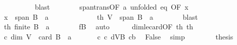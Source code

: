 \begin{isabellebody}
\ \ \ \ \ \ \ \ \isamarkupfalse%
\ blast\isanewline
\ \ \ \ \ \ \isamarkupfalse%
\ span{\isacharunderscore}{\kern0pt}trans{\isacharbrackleft}{\kern0pt}OF\ a{\isacharparenleft}{\kern0pt}{}{\isacharparenright}{\kern0pt}{\isacharcomma}{\kern0pt}\ unfolded\ eq{\isacharcomma}{\kern0pt}\ OF\ x{\isacharprime}{\kern0pt}{\isacharbrackright}{\kern0pt}\isanewline
\ \ \ \ \ \ \isamarkupfalse%
\ {\isachardoublequoteopen}x\ {\isasymin}\ span\ {\isacharparenleft}{\kern0pt}B\ {\isacharminus}{\kern0pt}\ {\isacharbraceleft}{\kern0pt}a{\isacharbraceright}{\kern0pt}{\isacharparenright}{\kern0pt}{\isachardoublequoteclose}\ \isacommand{{\isachardot}{\kern0pt}}\isamarkupfalse%
\isanewline
\ \ \ \ \isacommand{{\isacharbraceright}{\kern0pt}}\isamarkupfalse%
\isanewline
\ \ \ \ \isamarkupfalse%
\ \isamarkupfalse%
\ th{}{\isacharcolon}{\kern0pt}\ {\isachardoublequoteopen}V\ {\isasymsubseteq}\ span\ {\isacharparenleft}{\kern0pt}B\ {\isacharminus}{\kern0pt}\ {\isacharbraceleft}{\kern0pt}a{\isacharbraceright}{\kern0pt}{\isacharparenright}{\kern0pt}{\isachardoublequoteclose}\isanewline
\ \ \ \ \ \ \isamarkupfalse%
\ blast\isanewline
\ \ \ \ \isamarkupfalse%
\ th{}{\isacharcolon}{\kern0pt}\ {\isachardoublequoteopen}finite\ {\isacharparenleft}{\kern0pt}B\ {\isacharminus}{\kern0pt}\ {\isacharbraceleft}{\kern0pt}a{\isacharbraceright}{\kern0pt}{\isacharparenright}{\kern0pt}{\isachardoublequoteclose}\isanewline
\ \ \ \ \ \ \isamarkupfalse%
\ fB\ \isamarkupfalse%
\ auto\isanewline
\ \ \ \ \isamarkupfalse%
\ dim{\isacharunderscore}{\kern0pt}le{\isacharunderscore}{\kern0pt}card{\isacharbrackleft}{\kern0pt}OF\ th{}\ th{}{\isacharbrackright}{\kern0pt}\isanewline
\ \ \ \ \isamarkupfalse%
\ c{\isacharcolon}{\kern0pt}\ {\isachardoublequoteopen}dim\ V\ {\isasymle}\ card\ {\isacharparenleft}{\kern0pt}B\ {\isacharminus}{\kern0pt}\ {\isacharbraceleft}{\kern0pt}a{\isacharbraceright}{\kern0pt}{\isacharparenright}{\kern0pt}{\isachardoublequoteclose}\ \isacommand{{\isachardot}{\kern0pt}}\isamarkupfalse%
\isanewline
\ \ \ \ \isamarkupfalse%
\ c\ c{}\ dVB\ cb\ \isamarkupfalse%
\ False\ \isamarkupfalse%
\ simp\isanewline
\ \ \isacommand{{\isacharbraceright}{\kern0pt}}\isamarkupfalse%
\isanewline
\ \ \isamarkupfalse%
\ \isamarkupfalse%
\ {\isacharquery}{\kern0pt}thesis\isanewline

\end{isabellebody}
